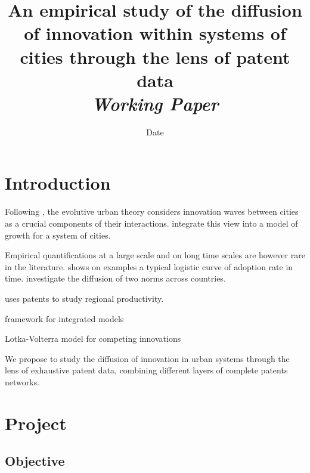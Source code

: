 


\title{An empirical study of the diffusion of innovation within systems of cities through the lens of patent data\bigskip\\
\textit{Working Paper}
}
\author{}
\date{Date}


\maketitle

\justify


\begin{abstract}

\end{abstract}




\section{Introduction}

Following \cite{hagerstrand1968innovation}, the evolutive urban theory considers innovation waves between cities as a crucial components of their interactions. \cite{favaro2011gibrat} integrate this view into a model of growth for a system of cities.

Empirical quantifications at a large scale and on long time scales are however rare in the literature. \cite{grubler1996time} shows on examples a typical logistic curve of adoption rate in time. \cite{albuquerque2007spatiotemporal} investigate the diffusion of two norms across countries.

\cite{acs2002patents} uses patents to study regional productivity.

\cite{wejnert2002integrating} framework for integrated models

\cite{sonis1983spatio} Lotka-Volterra model for competing innovations

We propose to study the diffusion of innovation in urban systems through the lens of exhaustive patent data, combining different layers of complete patents networks.




\section{Project}

\subsection{Objective}

